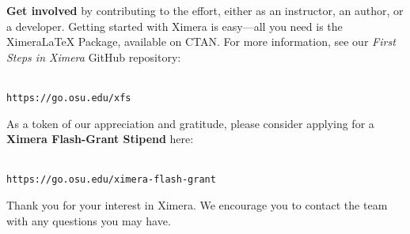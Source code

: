 \documentclass[twocolumn]{article}
\begin{document}
\begin{xframe}
    {\sffamily\bfseries Get involved} by contributing to the effort,
    either as an instructor, an author, or a developer. Getting started with
    Ximera is
    easy---all you need is the XimeraLaTeX Package, available on CTAN. For more
    information, see our \textit{First Steps in Ximera} GitHub repository:
    \begin{center}
        \\
        \small\tt  https://go.osu.edu/xfs
    \end{center}
    As a token of our appreciation and gratitude, please  consider applying for
    a \textbf{Ximera Flash-Grant Stipend} here:
    \begin{center}
        \\
        \small\tt  https://go.osu.edu/ximera-flash-grant
    \end{center}
    Thank you for your interest in Ximera. We encourage you to contact the team
    with  any questions you may have.
\end{xframe}
\end{document}
